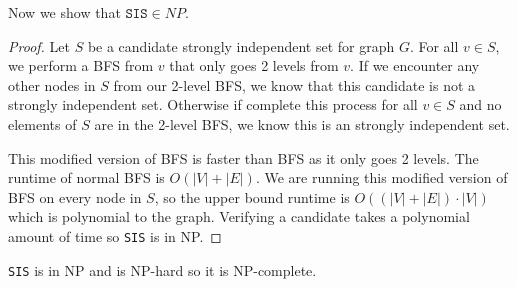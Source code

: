 \documentclass{article}
\begin{document}
Now we show that $\texttt{SIS} \in NP$.

\begin{proof}
    Let $S$ be a candidate strongly independent set for graph $G$.
    For all $v \in S$, we perform a BFS from $v$ that only goes 2 levels from $v$. 
    If we encounter any other nodes in $S$ from our 2-level BFS, we know that this candidate is not a strongly independent set.
    Otherwise if complete this process for all $v \in S$ and no elements of $S$ are in the 2-level BFS, we know this is an strongly independent set.

    This modified version of BFS is faster than BFS as it only goes 2 levels. The runtime of normal BFS is $O(|V| + |E|)$.
    We are running this modified version of BFS on every node in $S$, so the upper bound runtime is $O( (|V| + |E|)\cdot |V| )$ which is polynomial to the graph.
    Verifying a candidate takes a polynomial amount of time so \texttt{SIS} is in NP.
\end{proof}

\texttt{SIS} is in NP and is NP-hard so it is NP-complete.

\newpage
\end{document}
